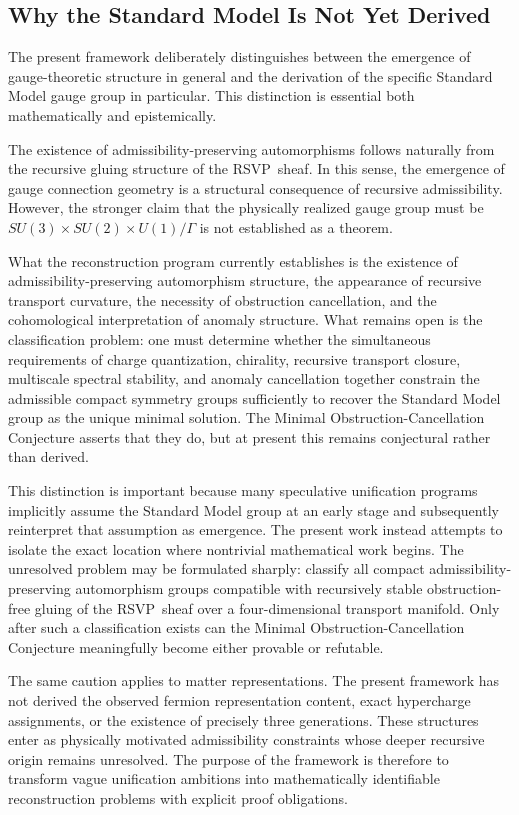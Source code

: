 \documentclass[12pt,a4paper]{article}
\newcommand{\RSVP}{\textrm{RSVP}}
\begin{document}
\subsection{Why the Standard Model Is Not Yet Derived}

The present framework deliberately distinguishes between the emergence of
gauge-theoretic structure in general and the derivation of the specific
Standard Model gauge group in particular. This distinction is essential both
mathematically and epistemically.

The existence of admissibility-preserving automorphisms follows naturally from
the recursive gluing structure of the \RSVP\ sheaf. In this sense, the
emergence of gauge connection geometry is a structural consequence of recursive
admissibility. However, the stronger claim that the physically realized gauge
group must be $SU(3)\times SU(2)\times U(1)/\Gamma$ is not established as a
theorem.

What the reconstruction program currently establishes is the existence of
admissibility-preserving automorphism structure, the appearance of recursive
transport curvature, the necessity of obstruction cancellation, and the
cohomological interpretation of anomaly structure. What remains open is the
classification problem: one must determine whether the simultaneous requirements
of charge quantization, chirality, recursive transport closure, multiscale
spectral stability, and anomaly cancellation together constrain the admissible
compact symmetry groups sufficiently to recover the Standard Model group as the
unique minimal solution. The Minimal Obstruction-Cancellation Conjecture asserts
that they do, but at present this remains conjectural rather than derived.

This distinction is important because many speculative unification programs
implicitly assume the Standard Model group at an early stage and subsequently
reinterpret that assumption as emergence. The present work instead attempts to
isolate the exact location where nontrivial mathematical work begins. The
unresolved problem may be formulated sharply: classify all compact
admissibility-preserving automorphism groups compatible with recursively stable
obstruction-free gluing of the \RSVP\ sheaf over a four-dimensional transport
manifold. Only after such a classification exists can the Minimal
Obstruction-Cancellation Conjecture meaningfully become either provable or
refutable.

The same caution applies to matter representations. The present framework has
not derived the observed fermion representation content, exact hypercharge
assignments, or the existence of precisely three generations. These structures
enter as physically motivated admissibility constraints whose deeper recursive
origin remains unresolved. The purpose of the framework is therefore to
transform vague unification ambitions into mathematically identifiable
reconstruction problems with explicit proof obligations.
\end{document}
